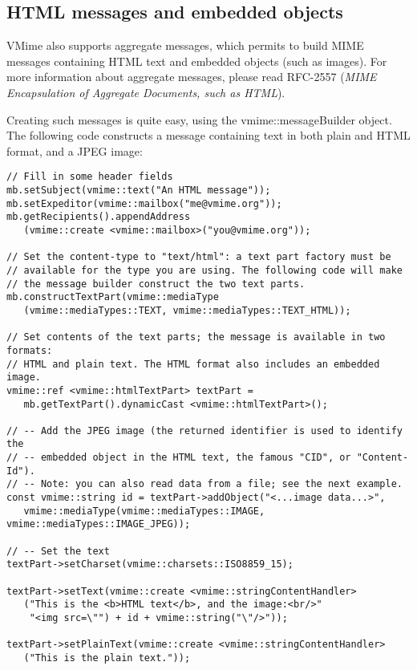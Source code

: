 \subsection{HTML messages and embedded objects} %

VMime also supports aggregate messages, which permits to build MIME messages
containing HTML text and embedded objects (such as images). For more information
about aggregate messages, please read RFC-2557 (\emph{MIME Encapsulation of
Aggregate Documents, such as HTML}).

Creating such messages is quite easy, using the {\vcode vmime::messageBuilder}
object. The following code constructs a message containing text in both plain
and HTML format, and a JPEG image:

\begin{lstlisting}[caption={Building an HTML message with an embedded image
using the {\vcode vmime::messageBuilder}}]
// Fill in some header fields
mb.setSubject(vmime::text("An HTML message"));
mb.setExpeditor(vmime::mailbox("me@vmime.org"));
mb.getRecipients().appendAddress
   (vmime::create <vmime::mailbox>("you@vmime.org"));

// Set the content-type to "text/html": a text part factory must be
// available for the type you are using. The following code will make
// the message builder construct the two text parts.
mb.constructTextPart(vmime::mediaType
   (vmime::mediaTypes::TEXT, vmime::mediaTypes::TEXT_HTML));

// Set contents of the text parts; the message is available in two formats:
// HTML and plain text. The HTML format also includes an embedded image.
vmime::ref <vmime::htmlTextPart> textPart =
   mb.getTextPart().dynamicCast <vmime::htmlTextPart>();

// -- Add the JPEG image (the returned identifier is used to identify the
// -- embedded object in the HTML text, the famous "CID", or "Content-Id").
// -- Note: you can also read data from a file; see the next example.
const vmime::string id = textPart->addObject("<...image data...>",
   vmime::mediaType(vmime::mediaTypes::IMAGE, vmime::mediaTypes::IMAGE_JPEG));

// -- Set the text
textPart->setCharset(vmime::charsets::ISO8859_15);

textPart->setText(vmime::create <vmime::stringContentHandler>
   ("This is the <b>HTML text</b>, and the image:<br/>"
    "<img src=\"") + id + vmime::string("\"/>"));

textPart->setPlainText(vmime::create <vmime::stringContentHandler>
   ("This is the plain text."));
\end{lstlisting}

